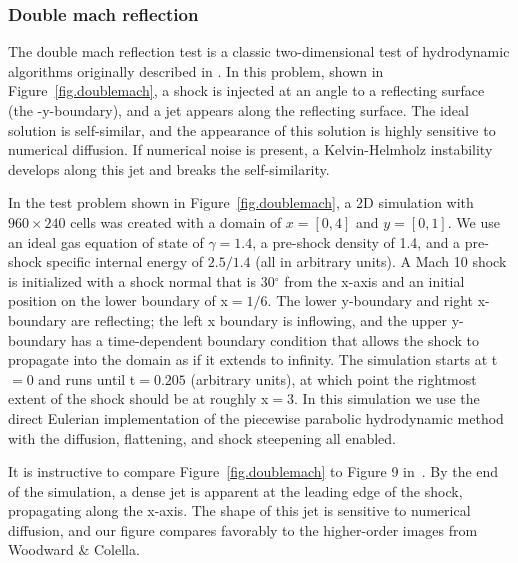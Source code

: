 \subsubsection{Double mach reflection}
\label{sec.tests.doublemach}

The double mach reflection test is a classic two-dimensional test of
hydrodynamic algorithms originally described in
\citet{1984JCoPh..54..115W} \citep[and more recently
in][]{2008ApJS..178..137S}.  In this problem, shown in
Figure~\ref{fig.doublemach}, a shock is injected at an angle to a
reflecting surface (the -y-boundary), and a jet appears along the
reflecting surface.  The ideal solution is self-similar, and the
appearance of this solution is highly sensitive to numerical
diffusion.  If numerical noise is present, a Kelvin-Helmholz
instability develops along this jet and breaks the self-similarity.

In the test problem shown in Figure~\ref{fig.doublemach}, a 2D
simulation with $960 \times 240$ cells was created with a domain of $x
= [0, 4]$ and $y = [0, 1]$.  We use an ideal gas equation of state of
$\gamma = 1.4$, a pre-shock density of 1.4, and a pre-shock specific
internal energy of $2.5/1.4$ (all in arbitrary units).  A Mach 10
shock is initialized with a shock normal that is 30$^\circ$ from the
x-axis and an initial position on the lower boundary of x$ = 1/6$.
The lower y-boundary and right x-boundary are reflecting; the left x
boundary is inflowing, and the upper y-boundary has a time-dependent
boundary condition that allows the shock to propagate into the domain
as if it extends to infinity.  The simulation starts at t$ = 0$ and
runs until t$ = 0.205$ (arbitrary units), at which point the rightmost
extent of the shock should be at roughly x$ = 3$.  In this simulation we use
the direct Eulerian implementation of the piecewise parabolic hydrodynamic
method with the diffusion, flattening, and shock steepening all enabled.

It is instructive to compare Figure~\ref{fig.doublemach} to Figure 9
in~\citet{1984JCoPh..54..115W}.  By the end of the simulation, a dense
jet is apparent at the leading edge of the shock, propagating along
the x-axis.  The shape of this jet is sensitive to numerical
diffusion, and our figure compares favorably to the higher-order
images from Woodward \& Colella.

